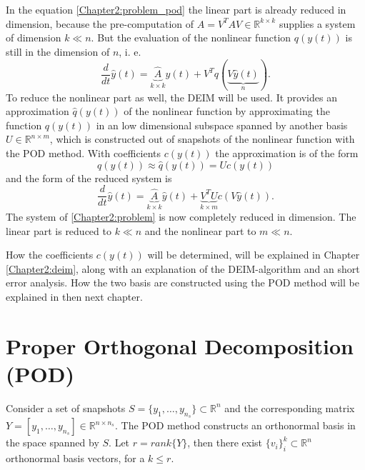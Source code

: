 In the equation \eqref{Chapter2:problem_pod} the linear part is already reduced in dimension, 
because the pre-computation of $\hat{A}= V^TAV \in \mathbb{R}^{k \times k}$ supplies a system of dimension $k \ll n$.
But the evaluation of the nonlinear function $q(y(t))$ is still in the dimension of $n$, i. e.
\begin{equation}\label{Chapter2:problem_pod_dim}
  \frac{d}{dt}\hat{y}(t) = \underbrace{\hat{A}}_{k \times k}\hat{y}(t)+ V^Tq(\underbrace{V\hat{y}(t)}_{n}).
\end{equation}
To reduce the nonlinear part as well, the DEIM will be used. It provides an approximation $\hat{q}(y(t))$
of the nonlinear function by approximating the function $q(y(t))$ in an low dimensional subspace spanned by another basis $U \in \mathbb{R}^{n \times m}$, which is 
constructed out of snapshots of the nonlinear function with the 
POD method.
With coefficients $c(y(t))$ the approximation is of the form
\begin{equation}
 q(y(t)) \approx \hat{q}(y(t)) = Uc(y(t))
\end{equation}
and the form of the reduced system is
\begin{equation}
  \frac{d}{dt}\hat{y}(t) = \underbrace{\hat{A}}_{k \times k}\hat{y}(t)+ \underbrace{V^TU}_{k \times m} c(V\hat{y}(t)).
\end{equation}
The system of \eqref{Chapter2:problem} is now completely reduced in dimension. The linear part is reduced to $k \ll n$ and the nonlinear part to $m \ll n$. 

How the coefficients $c(y(t))$ will be determined, will be explained in Chapter \ref{Chapter2:deim}, along with an explanation of the DEIM-algorithm and an short error analysis.
How the two basis are constructed using the POD method will be explained in then next chapter.


\section{Proper Orthogonal Decomposition (POD)}\label{Chapter2:pod}
Consider a set of snapshots $S= \{y_1,\dots,y_{n_s}\} \subset \mathbb{R}^n$ and the corresponding matrix $Y= 
[y_1,\dots,y_{n_s}] \in \mathbb{R}^{n \times n_s}$. The POD method constructs an orthonormal basis in the space spanned by $S$.
Let $r = rank\{Y\}$, then there exist $\{v_i\}^k_i \subset \mathbb{R}^n$ orthonormal basis vectors, for a $k \leq r$.

